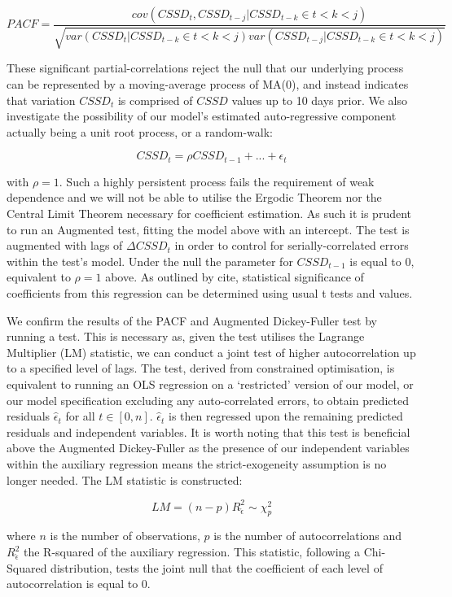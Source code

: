 \documentclass[12pt]{article}
\numberwithin{table}{section}   %
\begin{document}
$$
PACF=\frac{cov(CSSD_t,CSSD_{t-j}|CSSD_{t-k}\in{t<k<j})}{\sqrt{var(CSSD_t|CSSD_{t-k}\in{t<k<j})var(CSSD_{t-j}|CSSD_{t-k}\in{t<k<j})}}
$$

These significant partial-correlations reject the null that our underlying process can be represented by a moving-average process of MA(0), and instead indicates that variation $CSSD_t$ is comprised of $CSSD$ values up to 10 days prior. We also investigate the possibility of our model’s estimated auto-regressive component actually being a unit root process, or a random-walk:

$$
CSSD_t=\rho{CSSD_{t-1}}+...+\epsilon_t
$$

with $\rho=1$. Such a highly persistent process fails the requirement of weak dependence and we will not be able to utilise the Ergodic Theorem nor the Central Limit Theorem necessary for coefficient estimation. As such it is prudent to run an Augmented \citet{dfuller} test, fitting the model above with an intercept. The test is augmented with lags of $\Delta{CSSD_t}$ in order to control for serially-correlated errors within the test’s model. Under the null the parameter for $CSSD_{t-1}$ is equal to 0, equivalent to $\rho=1$ above. As outlined by cite, statistical significance of coefficients from this regression can be determined using usual t tests and values.

We confirm the results of the PACF and Augmented Dickey-Fuller test by running a \citet{breusch} \citet{godfrey} test. This is necessary as, given the test utilises the Lagrange Multiplier (LM) statistic, we can conduct a joint test of higher autocorrelation up to a specified level of lags. The test, derived from constrained optimisation, is equivalent to running an OLS regression on a ‘restricted’ version of our model, or our model specification excluding any auto-correlated errors, to obtain predicted residuals $\hat{\epsilon}_t$ for all $t\in[0,n]$. $\hat{\epsilon}_t$ is then regressed upon the remaining predicted residuals and independent variables. It is worth noting that this test is beneficial above the Augmented Dickey-Fuller as the presence of our independent variables within the auxiliary regression means the strict-exogeneity assumption is no longer needed. The LM statistic is constructed:

$$
LM=(n-p)R^2_{\hat{\epsilon}} \sim\chi^2_p
$$

where $n$ is the number of observations, $p$ is the number of autocorrelations and $R^2_{\hat{\epsilon}}$ the R-squared of the auxiliary regression. This statistic, following a Chi-Squared distribution, tests the joint null that the coefficient of each level of autocorrelation is equal to 0.
\end{document}
